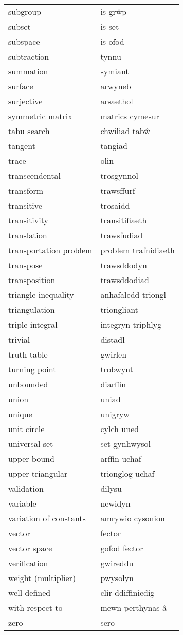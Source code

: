 \begin{supertabular}{p{0.22\textwidth}p{0.22\textwidth}}
subgroup & is-grŵp \\
subset & is-set \\
subspace & is-ofod \\
subtraction & tynnu \\
summation & symiant \\
surface & arwyneb \\
surjective & arsaethol \\
symmetric matrix & matrics cymesur \\
tabu search & chwiliad tabŵ \\
tangent & tangiad \\
trace & olin \\
transcendental & trosgynnol \\
transform & trawsffurf \\
transitive & trosaidd \\
transitivity & transitifiaeth \\
translation & trawsfudiad \\
transportation problem & problem trafnidiaeth \\
transpose & trawsddodyn \\
transposition & trawsddodiad \\
triangle inequality & anhafaledd triongl \\
triangulation & triongliant \\
triple integral & integryn triphlyg \\
trivial & distadl \\
truth table & gwirlen \\
turning point & trobwynt \\
unbounded & diarffin \\
union & uniad \\
unique & unigryw \\
unit circle & cylch uned \\
universal set & set gynhwysol \\
upper bound & arffin uchaf \\
upper triangular & trionglog uchaf \\
validation & dilysu \\
variable & newidyn \\
variation of constants & amrywio cysonion \\
vector & fector \\
vector space & gofod fector \\
verification & gwireddu \\
weight (multiplier) & pwysolyn \\
well defined & clir-ddiffiniedig \\
with respect to & mewn perthynas â \\
zero & sero \\
\end{supertabular}

